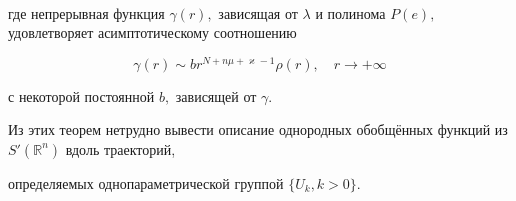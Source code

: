 \begin{theorem}[2]
\begin{multline}
\end{multline}

где непрерывная функция $\gamma(r),$ зависящая от $\lambda$ и полинома $P(e),$ удовлетворяет асимптотическому соотношению

\begin{equation*}


\gamma(r)\sim br^{N+n\mu+\varkappa-1}\rho(r),\quad r\to +\infty

\end{equation*}

с некоторой постоянной $b,$ зависящей от $\gamma.$

\end{theorem}



\smallskip



Из этих теорем нетрудно вывести описание однородных обобщённых функций из $S'(\mathbb R^n)$ вдоль траекторий,

определяемых однопараметрической группой $\{U_k, k>0\}$.





\smallskip




